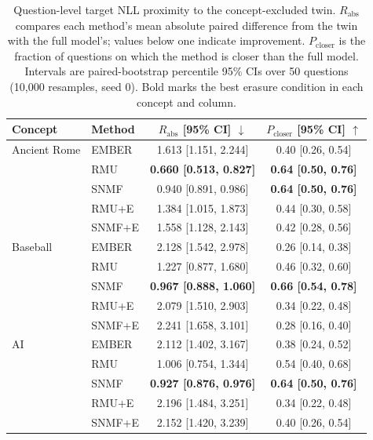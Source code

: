 \begin{table}[h]
  \centering
  \small
  \begin{tabular}{llcc}
    \toprule
    Concept & Method & $R_{\mathrm{abs}}$ [95\% CI] $\downarrow$
      & $P_{\mathrm{closer}}$ [95\% CI] $\uparrow$ \\
    \midrule
    Ancient Rome & EMBER & 1.613 [1.151, 2.244] & 0.40 [0.26, 0.54] \\
                 & RMU   & \textbf{0.660 [0.513, 0.827]} & \textbf{0.64 [0.50, 0.76]} \\
                 & SNMF  & 0.940 [0.891, 0.986] & \textbf{0.64 [0.50, 0.76]} \\
                 & RMU+E & 1.384 [1.015, 1.873] & 0.44 [0.30, 0.58] \\
                 & SNMF+E & 1.558 [1.128, 2.143] & 0.42 [0.28, 0.56] \\
    \midrule
    Baseball     & EMBER & 2.128 [1.542, 2.978] & 0.26 [0.14, 0.38] \\
                 & RMU   & 1.227 [0.877, 1.680] & 0.46 [0.32, 0.60] \\
                 & SNMF  & \textbf{0.967 [0.888, 1.060]} & \textbf{0.66 [0.54, 0.78]} \\
                 & RMU+E & 2.079 [1.510, 2.903] & 0.34 [0.22, 0.48] \\
                 & SNMF+E & 2.241 [1.658, 3.101] & 0.28 [0.16, 0.40] \\
    \midrule
    AI           & EMBER & 2.112 [1.402, 3.167] & 0.38 [0.24, 0.52] \\
                 & RMU   & 1.006 [0.754, 1.344] & 0.54 [0.40, 0.68] \\
                 & SNMF  & \textbf{0.927 [0.876, 0.976]} & \textbf{0.64 [0.50, 0.76]} \\
                 & RMU+E & 2.196 [1.484, 3.251] & 0.34 [0.22, 0.48] \\
                 & SNMF+E & 2.152 [1.420, 3.239] & 0.40 [0.26, 0.54] \\
    \bottomrule
  \end{tabular}
  \caption{Question-level target NLL proximity to the concept-excluded twin.
  $R_{\mathrm{abs}}$ compares each method's mean absolute paired difference
  from the twin with the full model's; values below one indicate improvement.
  $P_{\mathrm{closer}}$ is the fraction of questions on which the method is
  closer than the full model. Intervals are paired-bootstrap percentile 95\%
  CIs over 50 questions (10,000 resamples, seed 0). Bold marks the best
  erasure condition in each concept and column.}
  \label{tab:question-level-similarity}
\end{table}

